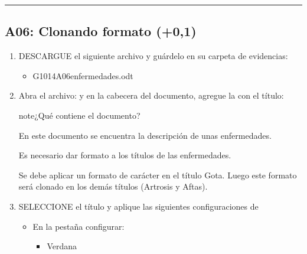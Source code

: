 \documentclass[letterpaper,10pt,spanish]{sphinxmanual}
\begin{document}
\bigskip\hrule\bigskip



\subsection{A06: Clonando formato  (+0,1)}
\label{\detokenize{1_guias/10ofimatica/G1014:a06-clonando-formato-101-0-1}}
\sphinxAtStartPar
{}
\begin{enumerate}
%
\item {} 
\sphinxAtStartPar
DESCARGUE el siguiente archivo y guárdelo en su carpeta de evidencias:
\begin{itemize}
\item {} 
\sphinxAtStartPar
G1014A06\sphinxhyphen{}enfermedades.odt 

\end{itemize}

\item {} 
\sphinxAtStartPar
Abra el archivo:  y en la cabecera del documento, agregue la  con el título: 

\begin{sphinxadmonition}{note}{¿Qué contiene el documento?}

\sphinxAtStartPar
En este documento se encuentra la descripción de unas enfermedades.

\sphinxAtStartPar
Es necesario dar formato a los títulos de las enfermedades.

\sphinxAtStartPar
Se debe aplicar un formato de carácter en el título Gota. Luego este formato será clonado en los demás títulos (Artrosis y Aftas).
\end{sphinxadmonition}

\item {} 
\sphinxAtStartPar
SELECCIONE el título  y aplique las siguientes configuraciones de 
\begin{itemize}
\item {} 
\sphinxAtStartPar
En la pestaña  configurar:
\begin{itemize}
\item {} 
\sphinxAtStartPar
{} Verdana


\end{itemize}
\end{itemize}
\end{enumerate}
\end{document}
